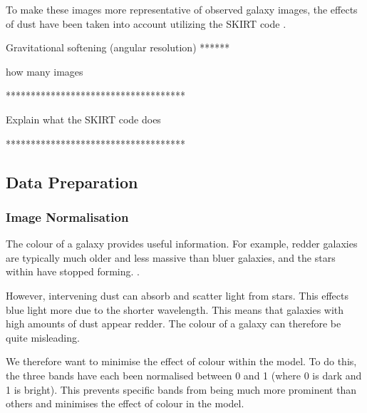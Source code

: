 \documentclass[12pt, onecolumn]{article}
\begin{document}
        To make these images more representative of observed galaxy images, the effects of dust have been taken into account utilizing the SKIRT code \cite{trayford}.

        Gravitational softening (angular resolution) ******

        how many images

        \vspace{5mm}
        ************************************
        
        Explain what the SKIRT code does

        ************************************
    
        
        \subsection{Data Preparation}
        
        \subsubsection{Image Normalisation}
        

            The colour of a galaxy provides useful information. For example, redder galaxies are typically much older and less massive than bluer galaxies, and the stars within have stopped forming. \cite{elliptical_red_low_sfr}.

            However, intervening dust can absorb and scatter light from stars. This effects blue light more due to the shorter wavelength. This means that galaxies with high amounts of dust appear redder. The colour of a galaxy can therefore be quite misleading.

            We therefore want to minimise the effect of colour within the model. To do this, the three bands have each been normalised between 0 and 1 (where 0 is dark and 1 is bright). This prevents specific bands from being much more prominent than others and minimises the effect of colour in the model.
\end{document}
